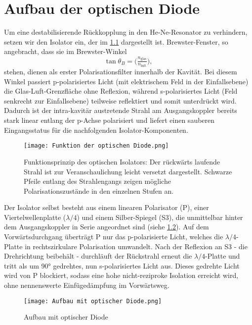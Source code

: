 \chapter{ Aufbau der optischen Diode}

Um eine destabilisierende Rückkopplung in den He-Ne-Resonator zu verhindern, setzen wir den Isolator ein, der im \cref{fig:function_of_optical_diode} dargestellt ist. 
Brewster-Fenster, so angebracht, dass sie im Brewster-Winkel \cite{introtoED} 
\begin{equation}
  \tan\theta_B = \bigl(\tfrac{n_{\mathrm{glas}}}{n_{\mathrm{luft}}}\bigr),
\end{equation}
stehen, dienen als erster Polarisationsfilter innerhalb der Kavität. 
Bei diesem Winkel passiert p-polarisiertes Licht (mit elektrischem Feld in der Einfallsebene) die Glas-Luft-Grenzfläche ohne Reflexion, während s-polarisiertes Licht (Feld senkrecht zur Einfallsebene) teilweise reflektiert und somit unterdrückt wird. 
Dadurch ist der intra-kavitär austretende Strahl am Ausgangskoppler bereits stark linear entlang der p-Achse polarisiert und liefert einen sauberen Eingangsstatus für die nachfolgenden Isolator-Komponenten.

\begin{figure}[htbp]
  \centering
  \texttt{[image: Funktion der optischen Diode.png]}
  \caption{Funktionsprinzip des optischen Isolators: Der rückwärts laufende Strahl ist zur Veranschaulichung leicht versetzt dargestellt. Schwarze Pfeile entlang des Strahlengangs zeigen mögliche Polarisationszustände in den einzelnen Stufen an.}
  \label{fig:function_of_optical_diode}
\end{figure}

Der Isolator selbst besteht aus einem linearen Polarisator (P), einer Viertelwellenplatte ($\lambda/4$) und einem Silber-Spiegel (S3), die unmittelbar hinter dem Ausgangskoppler in Serie angeordnet sind (siehe \cref{fig:aufbau_mit_optischer_diode}). 
Auf dem Vorwärtsdurchgang überträgt P nur das p-polarisierte Licht, welches die $\lambda/4$-Platte in rechtszirkulare Polarisation umwandelt. 
Nach der Reflexion an S3 - die Drehrichtung beibehält - durchläuft der Rückstrahl erneut die $\lambda/4$-Platte und tritt als um 90° gedrehtes, nun s-polarisiertes Licht aus. 
Dieses gedrehte Licht wird von P blockiert, sodass eine hohe nicht-reziproke Isolation erreicht wird, ohne nennenswerte Einfügedämpfung im Vorwärtsweg.
\begin{figure}[htbp]
  \centering
  \texttt{[image: Aufbau mit optischer Diode.png]}
  \caption{Aufbau mit optischer Diode}
  \label{fig:aufbau_mit_optischer_diode}
\end{figure}

